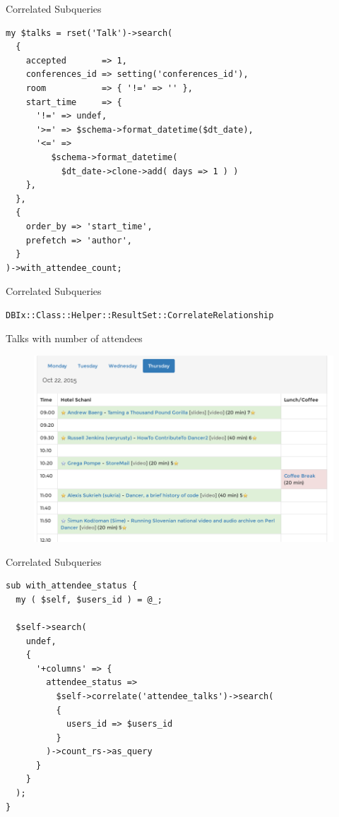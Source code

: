 \begin{frame}[fragile]{Correlated Subqueries}
\begin{lstlisting}
my $talks = rset('Talk')->search(
  {
    accepted       => 1,
    conferences_id => setting('conferences_id'),
    room           => { '!=' => '' },
    start_time     => {
      '!=' => undef,
      '>=' => $schema->format_datetime($dt_date),
      '<=' =>
         $schema->format_datetime( 
           $dt_date->clone->add( days => 1 ) )
    },
  },
  {
    order_by => 'start_time',
    prefetch => 'author',
  }
)->with_attendee_count;
\end{lstlisting}
\end{frame}

\begin{frame}[fragile]{Correlated Subqueries}
\begin{lstlisting}
DBIx::Class::Helper::ResultSet::CorrelateRelationship
\end{lstlisting}
\end{frame}

\begin{frame}{Talks with number of attendees}
\begin{figure}[!ht]
\centering
\includegraphics[width=0.8\linewidth]{img/schedule2015.png}
\end{figure}
\end{frame}

\begin{frame}[fragile]{Correlated Subqueries}
\begin{lstlisting}
sub with_attendee_status {
  my ( $self, $users_id ) = @_;

  $self->search(
    undef,
    {
      '+columns' => {
        attendee_status => 
          $self->correlate('attendee_talks')->search(
          {
            users_id => $users_id
          }
        )->count_rs->as_query
      }
    }
  );
}
\end{lstlisting}
\end{frame}

